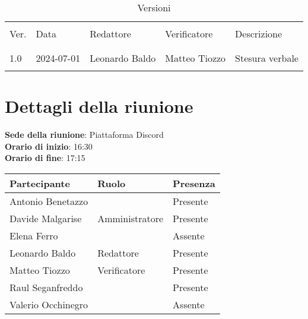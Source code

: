 \documentclass[italian,12pt]{article}
\begin{document}
\newcommand{\mySkip}[1][]{#1}



\newpage



\begin{table}[!h]
	\caption{Versioni}
	\footnotesize
	\begin{center}
		\begin{tabular}{ l l l l p{6cm} }
			\hline                                                                      \\[-2ex]
			Ver. & Data       & Redattore        & Verificatore       & Descrizione     \\
			\\[-2ex] \hline \\[-1.5ex]
			1.0  & 2024-07-01 & Leonardo Baldo   & Matteo Tiozzo      & Stesura verbale \\
			\\[-1.5ex] \hline
		\end{tabular}
	\end{center}
\end{table}

\newpage

\tableofcontents

\newpage

\section{Dettagli della riunione}

\textbf{Sede della riunione}: Piattaforma Discord\\
\textbf{Orario di inizio}: 16:30\\
\textbf{Orario di fine}: 17:15\\

\begin{flushleft}
	\begin{table}[!h]
		\begin{tabular}{ |l|l|l| }
			\hline
			\textbf{Partecipante} & \textbf{Ruolo} & \textbf{Presenza} \\
			\hline
			Antonio Benetazzo     & 			   & Presente          \\
			Davide Malgarise      & Amministratore & Presente          \\
			Elena Ferro           &                & Assente           \\
			Leonardo Baldo        & Redattore      & Presente          \\
			Matteo Tiozzo         & Verificatore   & Presente          \\
			Raul Seganfreddo      & 			   & Presente          \\
			Valerio Occhinegro    &                & Assente           \\
			\hline
		\end{tabular}
	\end{table}
\end{flushleft}
\end{document}
